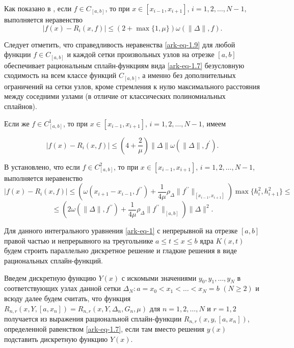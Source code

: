Как показано в \cite{ark-10}, если $f\in C_{[a,b]}$, то при $x\in[x_{i-1}, x_{i+1}]$,
$i=1,2,\dots,N-1$, выполняется неравенство
\begin{equation}\label{ark-eq-1.9}
|f(x)-R_i(x,f)|\leqslant (2+\max\{1,\mu\})\omega(\|\Delta\|, f).
\end{equation}

Следует отметить, что
справедливость неравенства \eqref{ark-eq-1.9} для любой функции $f\in C_{[a,b]}$ и каждой сетки
произвольных узлов на отрезке $[a,b]$ обеспечивает рациональным сплайн-функциям вида
\eqref{ark-eq-1.7}  безусловную сходимость на всем классе функций $C_{[a,b]}$, а именно
без дополнительных ограничений на сетки узлов, кроме
стремления к нулю максимального расстояния между соседними узлами (в отличие от
классических полиномиальных сплайнов).

Если же $f\in C^1_{[a,b]}$, то при $x\in[x_{i-1}, x_{i+1}]$, $i=1,2,\dots,N-1$,
имеем

\begin{equation}\label{ark-eq-1.10}
|f(x)-R_i(x,f)|\leqslant
\left(4+\frac 2\mu\right)\|\Delta\|\omega(\|\Delta\|, f^\prime).
\end{equation}

В \cite{ark-11} установлено, что если $f\in C^2_{[a,b]}$, то при $x\in[x_{i-1},x_{i+1}]$,
$i=1,2,\dots,N-1$, выполняется неравенство
$$
|f(x)-R_i(x,f)|\leqslant  \left(\omega(x_{i+1}-x_{i-1}, f^{\prime\prime})+
\frac 1{4\mu} \rho_\Delta \|f^{\prime\prime}\|_{[x_{i-1},x_{i+1}]}\right)
\max\{h_i^2, h_{i+1}^2\}\leqslant
$$
\begin{equation}\label{ark-eq-1.11}
\leqslant \left(2\omega(\|\Delta\|, f^{\prime\prime})+\frac 1{4\mu}\rho_\Delta \|f^{\prime\prime}\|_{[a,b]}\right)
\|\Delta\|^2.
\end{equation}


Для данного интегрального уравнения \eqref{ark-eq-1}  с непрерывной на отрезке $[a,b]$ правой частью
и непрерывного на треугольнике $a\leqslant t \leqslant x \leqslant b$ ядра $K(x,t)$
будем строить параллельно дискретное решение и гладкие решения в виде рациональных сплайн-функций.

Введем дискретную функцию $Y(x)$ с искомыми значениями $y_0, y_1, \dots, y_N$
в соответствующих узлах данной сетки $\Delta_N: a=x_0<x_1<\dots<x_N=b$ $(N\geqslant 2)$
и всюду далее будем считать, что функция
 $R_{n,r}(x, Y, [a, x_n])= R_{n,r}(x, Y, \Delta_n, G_n, \mu)$ для $n=1,2,\dots,N$ и $r=1,2$
получается из выражения рациональной сплайн-функции $R_{n,r}(x,y,[a,x_n])$,
определенной равенством \eqref{ark-eq-1.7}, если там вместо решения $y(x)$ подставить дискретную функцию
$Y(x)$.

